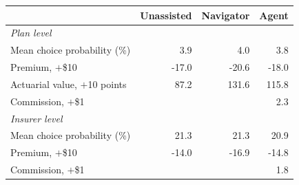 \begin{tabular}{lrrr}
\hline\hline
 & Unassisted & Navigator & Agent \\
\hline
\multicolumn{4}{l}{\emph{Plan level}} \\
\quad Mean choice probability (\%) & 3.9 & 4.0 & 3.8 \\
\quad Premium, $+$\$10 & -17.0 & -20.6 & -18.0 \\
\quad Actuarial value, $+$10 points & 87.2 & 131.6 & 115.8 \\
\quad Commission, $+$\$1 &  &  & 2.3 \\
\multicolumn{4}{l}{\emph{Insurer level}} \\
\quad Mean choice probability (\%) & 21.3 & 21.3 & 20.9 \\
\quad Premium, $+$\$10 & -14.0 & -16.9 & -14.8 \\
\quad Commission, $+$\$1 &  &  & 1.8 \\
\hline\hline
\end{tabular}
